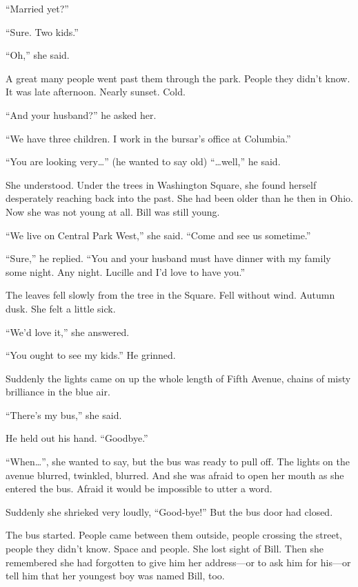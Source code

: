 \documentclass{article}        %
\begin{document}
“Married yet?”

“Sure. Two kids.”

“Oh,” she said.

A great many people went past them through the park. People they didn’t know. It was late afternoon. Nearly sunset. Cold.

“And your husband?” he asked her.

“We have three children. I work in the bursar’s office at Columbia.”

“You are looking very…” (he wanted to say old) “…well,” he said.

She understood. Under the trees in Washington Square, she found herself desperately reaching back into the past. She had been older than he then in Ohio. Now she was not young at all. Bill was still young.

“We live on Central Park West,” she said. “Come and see us sometime.”

“Sure,” he replied. “You and your husband must have dinner with my family some night. Any night. Lucille and I’d love to have you.”

The leaves fell slowly from the tree in the Square. Fell without wind. Autumn dusk. She felt a little sick.

“We’d love it,” she answered.

“You ought to see my kids.” He grinned.

Suddenly the lights came on up the whole length of Fifth Avenue, chains of misty brilliance in the blue air.

“There’s my bus,” she said.

He held out his hand. “Goodbye.”

“When…”, she wanted to say, but the bus was ready to pull off. The lights on the avenue blurred, twinkled, blurred. And she was afraid to open her mouth as she entered the bus. Afraid it would be impossible to utter a word.

Suddenly she shrieked very loudly, “Good-bye!” But the bus door had closed.

The bus started. People came between them outside, people crossing the street, people they didn’t know. Space and people. She lost sight of Bill. Then she remembered she had forgotten to give him her address—or to ask him for his—or tell him that her youngest boy was named Bill, too.
\end{document}
